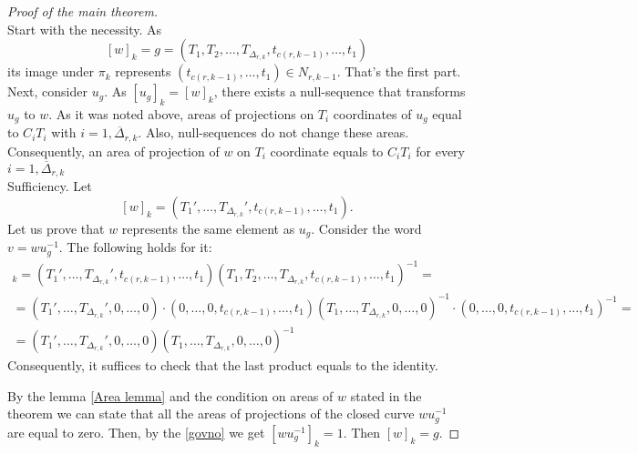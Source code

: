 \documentclass[11pt]{amsart}
\theoremstyle{plain}
\theoremstyle{definition}
\numberwithin{equation}{section}
\begin{document}
\begin{proof}[Proof of the main theorem]\ \\
Start with the necessity. As $$[w]_k=g=(T_1,T_2,\ldots, T_{\Delta_{r,k}},t_{c(r,k-1)},\ldots, t_1)$$
its image under $\pi_k$ represents $(t_{c(r,k-1)},\ldots, t_1)\in N_{r,k-1}$. That's the first part. Next, consider $u_g$. As $[u_g]_k=[w]_k$, there exists a null-sequence that transforms $u_g$ to $w$. As it was noted above, areas of projections on $T_i$ coordinates of $u_g$ equal to $C_iT_i$ with $i=\overline{1,\Delta_{r,k}}$. Also, null-sequences do not change these areas. Consequently, an area of projection of $w$ on $T_i$ coordinate equals to $C_iT_i$ for every $i=\overline{1,\Delta_{r,k}}$\\


Sufficiency. Let 
$$[w]_k=(T_1',\ldots,T_{\Delta_{r,k}}',t_{c(r,k-1)},\ldots,t_1).$$ Let us prove that $w$ represents the same element as $u_g$. Consider the word $v = wu_g^{-1}$. The following holds for it:
\begin{multline*}
    [v]_k = (T_1',\ldots,T_{\Delta_{r,k}}',t_{c(r,k-1)},\ldots,t_1)(T_1,T_2,\ldots, T_{\Delta_{r,k}},t_{c(r,k-1)},\ldots, t_1)^{-1} = \\ = (T_1',\ldots,T_{\Delta_{r,k}}',0,\ldots,0)\cdot(0,\ldots,0,t_{c(r,k-1)},\ldots,t_1)(T_1,\ldots,T_{\Delta_{r,k}},0,\ldots,0)^{-1}\cdot(0,\ldots,0,t_{c(r,k-1)},\ldots,t_1)^{-1} = \\ = 
    (T_1',\ldots,T_{\Delta_{r,k}}',0,\ldots,0)(T_1,\ldots,T_{\Delta_{r,k}},0,\ldots,0)^{-1}
    \end{multline*}
    Consequently, it suffices to check that the last product equals to the identity.
    
    By the lemma \ref{Area lemma} and the condition on areas of $w$ stated in the theorem we can state that all the areas of projections of the closed curve $wu_g^{-1}$ are equal to zero. Then, by the \ref{govno} we get $[wu_g^{-1}]_k = 1$. Then $[w]_k = g$.




\end{proof}
\end{document}

